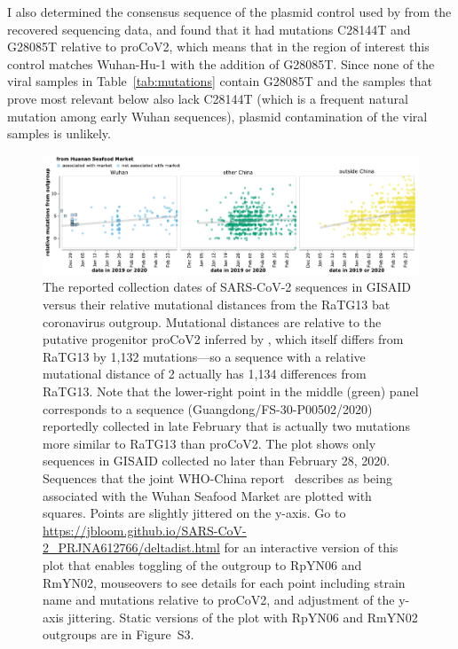 \documentclass[9pt,twocolumn,twoside]{gsajnl_modified}
\begin{document}
I also determined the consensus sequence of the plasmid control used by \citet{wang2020medRxiv} from the recovered sequencing data, and found that it had mutations C28144T and G28085T relative to proCoV2, which means that in the region of interest this control matches Wuhan-Hu-1 with the addition of G28085T.
Since none of the viral samples in Table~\ref{tab:mutations} contain G28085T and the samples that prove most relevant below also lack C28144T (which is a frequent natural mutation among early Wuhan sequences), plasmid contamination of the viral samples is unlikely.

\begin{figure}
\centering
\includegraphics[width=\linewidth]{figures/Figure_2.pdf}
\caption{The reported collection dates of SARS-CoV-2 sequences in GISAID versus their relative mutational distances from the RaTG13 bat coronavirus outgroup.
Mutational distances are relative to the putative progenitor proCoV2 inferred by \citet{kumar2021evolutionary}, which itself differs from RaTG13 by 1,132 mutations---so a sequence with a relative mutational distance of 2 actually has 1,134 differences from RaTG13.
Note that the lower-right point in the middle (green) panel corresponds to a sequence (Guangdong/FS-30-P00502/2020) reportedly collected in late February that is actually two mutations more similar to RaTG13 than proCoV2.
The plot shows only sequences in GISAID collected no later than February 28, 2020.
Sequences that the joint WHO-China report~\citep{WHO2021origins} describes as being associated with the Wuhan Seafood Market are plotted with squares.
Points are slightly jittered on the y-axis.
Go to \url{https://jbloom.github.io/SARS-CoV-2_PRJNA612766/deltadist.html} for an interactive version of this plot that enables toggling of the outgroup to RpYN06 and RmYN02, mouseovers to see details for each point including strain name and mutations relative to proCoV2, and adjustment of the y-axis jittering.
Static versions of the plot with RpYN06 and RmYN02 outgroups are in Figure~S3.
}
\label{fig:deltadist_RaTG13}
\end{figure}
\end{document}
